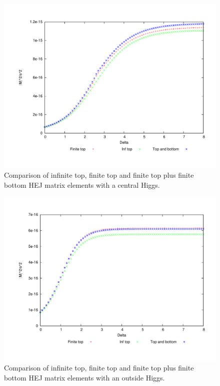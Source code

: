 \begin{figure}[t]
\centering
\includegraphics[scale=0.45]{Images/qg_qgH_compare_central.pdf}
\caption{Comparison of infinite top, finite top and finite top plus finite bottom HEJ matrix elements with a central Higgs.}
\label{fig:qg_qgh_compare}
\end{figure}

\begin{figure}[t]
\centering
\includegraphics[scale=0.45]{Images/qg_qgH_compare_outside.pdf}
\caption{Comparison of infinite top, finite top and finite top plus finite bottom HEJ matrix elements with an outside Higgs.}
\label{fig:qg_qgh_compare_out}
\end{figure}

